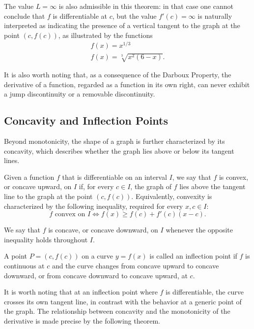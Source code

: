 \begin{remark}
The value $L = \infty$ is also admissible in this theorem: in that case one cannot conclude that $f$ is differentiable at $c$, but the value $f'(c) = \infty$ is naturally interpreted as indicating the presence of a vertical tangent to the graph at the point $(c, f(c))$, as illustrated by the functions
\[
\begin{gathered}
f(x) = x^{1/3} \\
f(x) = \sqrt[3]{x^2(6-x)}.
\end{gathered}
\]

It is also worth noting that, as a consequence of the Darboux Property, the derivative of a function, regarded as a function in its own right, can never exhibit a jump discontinuity or a removable discontinuity.
\end{remark}

\subsection{Concavity and Inflection Points}

Beyond monotonicity, the shape of a graph is further characterized by its concavity, which describes whether the graph lies above or below its tangent lines.

\begin{definition}
Given a function $f$ that is differentiable on an interval $I$, we say that $f$ is convex, or concave upward, on $I$ if, for every $c \in I$, the graph of $f$ lies above the tangent line to the graph at the point $(c, f(c))$. Equivalently, convexity is characterized by the following inequality, required for every $x, c \in I$:
\[
f \text{ convex on } I \iff f(x) \geq f(c) + f'(c)(x-c).
\]

We say that $f$ is concave, or concave downward, on $I$ whenever the opposite inequality holds throughout $I$.
\end{definition}

\begin{definition}
A point $P = (c, f(c))$ on a curve $y = f(x)$ is called an inflection point if $f$ is continuous at $c$ and the curve changes from concave upward to concave downward, or from concave downward to concave upward, at $c$.
\end{definition}

It is worth noting that at an inflection point where $f$ is differentiable, the curve crosses its own tangent line, in contrast with the behavior at a generic point of the graph. The relationship between concavity and the monotonicity of the derivative is made precise by the following theorem.

